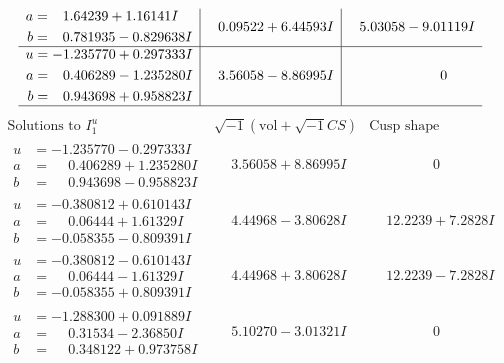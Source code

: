 \documentclass[1p]{elsarticle_modified}
\theoremstyle{definition}
\newcommand{\I}{\sqrt{-1}}
\begin{document}
$$\begin{array}{c|c|c}
\begin{aligned}
a &= \phantom{-}1.64239 + 1.16141 I \\
b &= \phantom{-}0.781935 - 0.829638 I\end{aligned}
 & \phantom{-}0.09522 + 6.44593 I & \phantom{-}5.03058 - 9.01119 I \\ \hline\begin{aligned}
u &= -1.235770 + 0.297333 I \\
a &= \phantom{-}0.406289 - 1.235280 I \\
b &= \phantom{-}0.943698 + 0.958823 I\end{aligned}
 & \phantom{-}3.56058 - 8.86995 I & \phantom{-0.000000 } 0\\
 \hline 
 \end{array}$$\newpage$$\begin{array}{c|c|c}  
\text{Solutions to }I^u_{1}& \I (\text{vol} + \sqrt{-1}CS) & \text{Cusp shape}\\
 \hline 
\begin{aligned}
u &= -1.235770 - 0.297333 I \\
a &= \phantom{-}0.406289 + 1.235280 I \\
b &= \phantom{-}0.943698 - 0.958823 I\end{aligned}
 & \phantom{-}3.56058 + 8.86995 I & \phantom{-0.000000 } 0 \\ \hline\begin{aligned}
u &= -0.380812 + 0.610143 I \\
a &= \phantom{-}0.06444 + 1.61329 I \\
b &= -0.058355 - 0.809391 I\end{aligned}
 & \phantom{-}4.44968 - 3.80628 I & \phantom{-}12.2239 + 7.2828 I \\ \hline\begin{aligned}
u &= -0.380812 - 0.610143 I \\
a &= \phantom{-}0.06444 - 1.61329 I \\
b &= -0.058355 + 0.809391 I\end{aligned}
 & \phantom{-}4.44968 + 3.80628 I & \phantom{-}12.2239 - 7.2828 I \\ \hline\begin{aligned}
u &= -1.288300 + 0.091889 I \\
a &= \phantom{-}0.31534 - 2.36850 I \\
b &= \phantom{-}0.348122 + 0.973758 I\end{aligned}
 & \phantom{-}5.10270 - 3.01321 I & \phantom{-0.000000 } 0 \\ \hline\begin{aligned}

\end{aligned}
\end{array}$$
\end{document}
